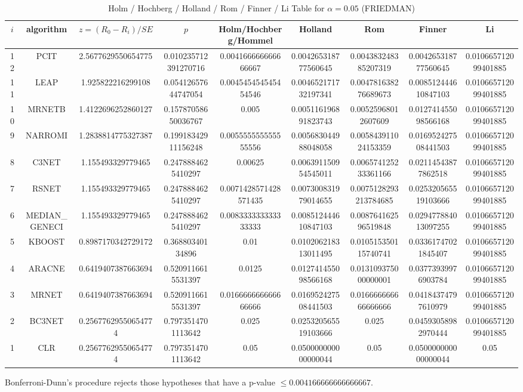 \documentclass[a4paper,10pt]{article}
\begin{document}
\begin{landscape}
\newpage

\begin{table}[!htp]
\centering\scriptsize
\caption{Holm / Hochberg / Holland / Rom / Finner / Li Table for $\alpha=0.05$ (FRIEDMAN)}
\begin{tabular}{ccccccccc}
$i$&algorithm&$z=(R_0 - R_i)/SE$&$p$&Holm/Hochberg/Hommel&Holland&Rom&Finner&Li\\
\hline
12&PCIT&2.5677629550654775&0.010235712391270716&0.004166666666666667&0.004265318777560645&0.004383248385207319&0.004265318777560645&0.010665712099401885\\
11&LEAP&1.925822216299108&0.05412657644747054&0.004545454545454546&0.004652171732197341&0.004781638276689673&0.008512444610847103&0.010665712099401885\\
10&MRNETB&1.4122696252860127&0.15787058650036767&0.005&0.005116196891823743&0.00525968012607609&0.012741455098566168&0.010665712099401885\\
9&NARROMI&1.2838814775327387&0.19918342911156248&0.005555555555555556&0.005683044988048058&0.005843911024153359&0.016952427508441503&0.010665712099401885\\
8&C3NET&1.155493329779465&0.2478884625410297&0.00625&0.006391150954545011&0.006574125233361166&0.02114543877862518&0.010665712099401885\\
7&RSNET&1.155493329779465&0.2478884625410297&0.0071428571428571435&0.007300831979014655&0.0075128293213784685&0.025320565519103666&0.010665712099401885\\
6&MEDIAN_GENECI&1.155493329779465&0.2478884625410297&0.008333333333333333&0.008512444610847103&0.008764162596519848&0.029477884013097255&0.010665712099401885\\
5&KBOOST&0.8987170342729172&0.36880340134896&0.01&0.010206218313011495&0.010515350115740741&0.03361747021845407&0.010665712099401885\\
4&ARACNE&0.6419407387663694&0.5209116615531397&0.0125&0.012741455098566168&0.013109375000000001&0.03773939976903784&0.010665712099401885\\
3&MRNET&0.6419407387663694&0.5209116615531397&0.016666666666666666&0.016952427508441503&0.016666666666666666&0.04184374797610979&0.010665712099401885\\
2&BC3NET&0.25677629550654774&0.7973514701113642&0.025&0.025320565519103666&0.025&0.04593058982970444&0.010665712099401885\\
1&CLR&0.25677629550654774&0.7973514701113642&0.05&0.050000000000000044&0.05&0.050000000000000044&0.05\\
\hline
\end{tabular}
\end{table}
Bonferroni-Dunn's procedure rejects those hypotheses that have a p-value $\le0.004166666666666667$.



\end{landscape}
\end{document}

